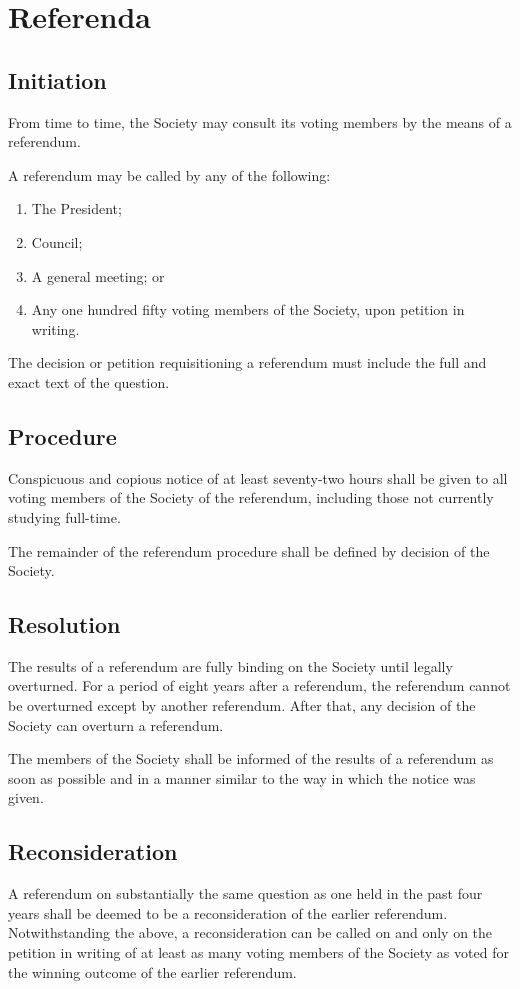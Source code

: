 \section{Referenda}
\subsection{Initiation}
From time to time, the Society may consult its voting members by the means of a
referendum.

A referendum may be called by any of the following:
\begin{enumerate}
  \item The President;
  \item Council;
  \item A general meeting; or
  \item Any one hundred fifty voting members of the Society, upon petition in
    writing.
\end{enumerate}

The decision or petition requisitioning a referendum must include the full and
exact text of the question.

\subsection{Procedure}
Conspicuous and copious notice of at least seventy-two hours shall be given to
all voting members of the Society of the referendum, including those not
currently studying full-time.

The remainder of the referendum procedure shall be defined by decision of the
Society.

\subsection{Resolution}
The results of a referendum are fully binding on the Society until legally
overturned. For a period of eight years after a referendum, the referendum
cannot be overturned except by another referendum. After that, any decision of
the Society can overturn a referendum.

The members of the Society shall be informed of the results of a referendum as
soon as possible and in a manner similar to the way in which the notice was
given.

\subsection{Reconsideration}
A referendum on substantially the same question as one held in the past four
years shall be deemed to be a reconsideration of the earlier referendum.
Notwithstanding the above, a reconsideration can be called on and only on the
petition in writing of at least as many voting members of the Society as voted
for the winning outcome of the earlier referendum.

